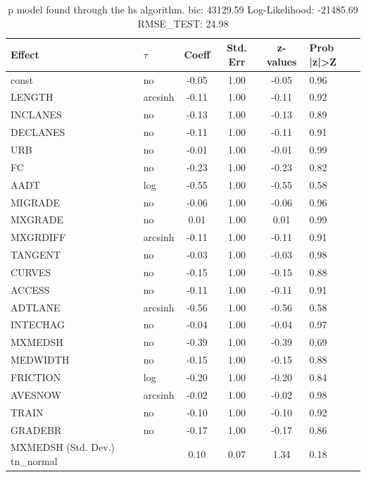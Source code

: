\begin{table}
	\caption{p model found through the hs algorithm. bic: 43129.59 Log-Likelihood: -21485.69 RMSE_TEST: 24.98}
	\begin{center}
		\begin{tabular}{|l|l|c|c|c|l|}
			\hline
			Effect & $\tau$ & Coeff & Std. Err & z-values & Prob |z|>Z \\
			\hline
			const & no & -0.05 & 1.00 & -0.05 & 0.96 \\
			\hline
			LENGTH & arcsinh & -0.11 & 1.00 & -0.11 & 0.92 \\
			\hline
			INCLANES & no & -0.13 & 1.00 & -0.13 & 0.89 \\
			\hline
			DECLANES & no & -0.11 & 1.00 & -0.11 & 0.91 \\
			\hline
			URB & no & -0.01 & 1.00 & -0.01 & 0.99 \\
			\hline
			FC & no & -0.23 & 1.00 & -0.23 & 0.82 \\
			\hline
			AADT & log & -0.55 & 1.00 & -0.55 & 0.58 \\
			\hline
			MIGRADE & no & -0.06 & 1.00 & -0.06 & 0.96 \\
			\hline
			MXGRADE & no & 0.01 & 1.00 & 0.01 & 0.99 \\
			\hline
			MXGRDIFF & arcsinh & -0.11 & 1.00 & -0.11 & 0.91 \\
			\hline
			TANGENT & no & -0.03 & 1.00 & -0.03 & 0.98 \\
			\hline
			CURVES & no & -0.15 & 1.00 & -0.15 & 0.88 \\
			\hline
			ACCESS & no & -0.11 & 1.00 & -0.11 & 0.91 \\
			\hline
			ADTLANE & arcsinh & -0.56 & 1.00 & -0.56 & 0.58 \\
			\hline
			INTECHAG & no & -0.04 & 1.00 & -0.04 & 0.97 \\
			\hline
			MXMEDSH & no & -0.39 & 1.00 & -0.39 & 0.69 \\
			\hline
			MEDWIDTH & no & -0.15 & 1.00 & -0.15 & 0.88 \\
			\hline
			FRICTION & log & -0.20 & 1.00 & -0.20 & 0.84 \\
			\hline
			AVESNOW & arcsinh & -0.02 & 1.00 & -0.02 & 0.98 \\
			\hline
			TRAIN & no & -0.10 & 1.00 & -0.10 & 0.92 \\
			\hline
			GRADEBR & no & -0.17 & 1.00 & -0.17 & 0.86 \\
			\hline
			MXMEDSH (Std. Dev.) tn_normal &  & 0.10 & 0.07 & 1.34 & 0.18 \\

\end{tabular}
\end{center}
\end{table}
